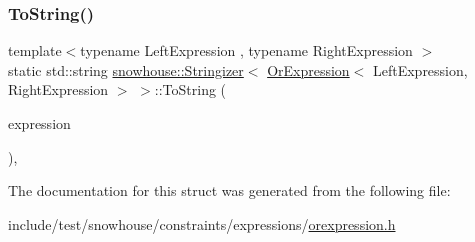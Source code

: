 \subsubsection{\texorpdfstring{ToString()}{ToString()}}
{\footnotesize\ttfamily template$<$typename Left\+Expression , typename Right\+Expression $>$ \\
static std\+::string \mbox{\hyperlink{structsnowhouse_1_1Stringizer}{snowhouse\+::\+Stringizer}}$<$ \mbox{\hyperlink{structsnowhouse_1_1OrExpression}{Or\+Expression}}$<$ Left\+Expression, Right\+Expression $>$ $>$\+::To\+String (\begin{DoxyParamCaption}\item[{const \mbox{\hyperlink{structsnowhouse_1_1OrExpression}{Or\+Expression}}$<$ Left\+Expression, Right\+Expression $>$ \&}]{expression }\end{DoxyParamCaption})\hspace{0.3cm}{\ttfamily [inline]}, {\ttfamily [static]}}



The documentation for this struct was generated from the following file\+:\begin{DoxyCompactItemize}
\item 
include/test/snowhouse/constraints/expressions/\mbox{\hyperlink{orexpression_8h}{orexpression.\+h}}\end{DoxyCompactItemize}
